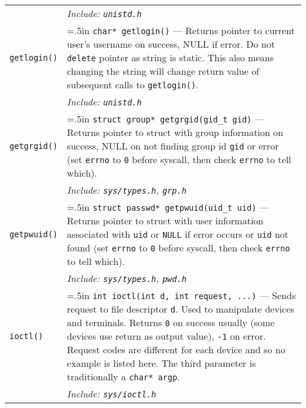 \documentclass{article}
\newcommand{\indenth}[1][.5]{\hangindent=#1in
                         \hangafter=1 }
\begin{document}
\begin{longtabu}{|p{.9in}|p{6.3in}<{\strut}|}
        \\
    & \hspace{.5in}\it Include: \rm\texttt{unistd.h}
        \\ 
    \texttt{getlogin()} & \indenth\texttt{char* getlogin()} --- Returns pointer to current user's username on success, NULL if error. Do not \texttt{delete} pointer as string is static. This also means changing the string will change return value of subsequent calls to \texttt{getlogin()}.
        \\
    & \hspace{.5in}\it Include: \rm\texttt{unistd.h}
        \\ 
    \texttt{getgrgid()} & \indenth\texttt{struct group* getgrgid(gid\_t gid)} --- Returns pointer to struct with group information on success, NULL on not finding group id \texttt{gid} or error (set \texttt{errno} to \texttt{0} before syscall, then check \texttt{errno} to tell which). 
        \\
    & \hspace{.5in}\it Include: \rm\texttt{sys/types.h}, \texttt{grp.h}
        \\
    \texttt{getpwuid()} & \indenth\texttt{struct passwd* getpwuid(uid\_t uid)} --- Returns pointer to struct with user information associated with \texttt{uid} or \texttt{NULL} if error occurs or \texttt{uid} not found (set \texttt{errno} to \texttt{0} before syscall, then check \texttt{errno} to tell which).
        \\
    & \hspace{.5in}\it Include: \rm\texttt{sys/types.h}, \texttt{pwd.h}
        \\ \hline
    \texttt{ioctl()} & \indenth\texttt{int ioctl(int d, int request, ...)} --- Sends request to file descriptor \texttt{d}.  Used to manipulate devices and terminals. Returns \texttt{0} on success usually (some devices use return as output value), \texttt{-1} on error. Request codes are different for each device and so no example is listed here. The third parameter is traditionally a \texttt{char* argp}. 
        \\ 
    & \hspace{.5in}\it Include: \rm\texttt{sys/ioctl.h}
        \\ \hline
\end{longtabu}
\end{document}
